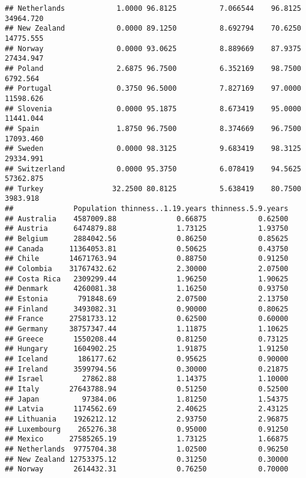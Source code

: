\documentclass[
]{article}
\begin{document}
\begin{verbatim}
## Netherlands            1.0000 96.8125          7.066544    96.8125 34964.720
## New Zealand            0.0000 89.1250          8.692794    70.6250 14775.555
## Norway                 0.0000 93.0625          8.889669    87.9375 27434.947
## Poland                 2.6875 96.7500          6.352169    98.7500  6792.564
## Portugal               0.3750 96.5000          7.827169    97.0000 11598.626
## Slovenia               0.0000 95.1875          8.673419    95.0000 11441.044
## Spain                  1.8750 96.7500          8.374669    96.7500 17093.460
## Sweden                 0.0000 98.3125          9.683419    98.3125 29334.991
## Switzerland            0.0000 95.3750          6.078419    94.5625 57362.875
## Turkey                32.2500 80.8125          5.638419    80.7500  3983.918
##              Population thinness..1.19.years thinness.5.9.years
## Australia    4587009.88              0.66875            0.62500
## Austria      6474879.88              1.73125            1.93750
## Belgium      2884042.56              0.86250            0.85625
## Canada      11364053.81              0.50625            0.43750
## Chile       14671763.94              0.88750            0.91250
## Colombia    31767432.62              2.30000            2.07500
## Costa Rica   2309299.44              1.96250            1.90625
## Denmark      4260081.38              1.16250            0.93750
## Estonia       791848.69              2.07500            2.13750
## Finland      3493082.31              0.90000            0.80625
## France      27581733.12              0.62500            0.60000
## Germany     38757347.44              1.11875            1.10625
## Greece       1550208.44              0.81250            0.73125
## Hungary      1604902.25              1.91875            1.91250
## Iceland       186177.62              0.95625            0.90000
## Ireland      3599794.56              0.30000            0.21875
## Israel         27862.88              1.14375            1.10000
## Italy       27643788.94              0.51250            0.52500
## Japan          97384.06              1.81250            1.54375
## Latvia       1174562.69              2.40625            2.43125
## Lithuania    1926212.12              2.93750            2.96875
## Luxembourg    265276.38              0.95000            0.91250
## Mexico      27585265.19              1.73125            1.66875
## Netherlands  9775704.38              1.02500            0.96250
## New Zealand 12753375.12              0.31250            0.30000
## Norway       2614432.31              0.76250            0.70000

\end{verbatim}
\end{document}
